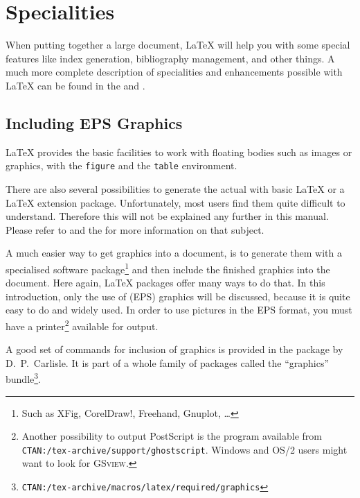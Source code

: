  
\chapter{Specialities}
\begin{intro}
  When putting together a large document, \LaTeX{} will help you
  with some special features like index generation,
  bibliography management, and other things.
  A much more complete description of specialities and
  enhancements possible with \LaTeX{} can be found in the
  {\normalfont\manual{}} and {\normalfont \companion}.
\end{intro}

\section{Including EPS Graphics}
\LaTeX{} provides the basic facilities to work with floating bodies
such as images or graphics, with the \texttt{figure} and the
\texttt{table} environment.

There are also several possibilities to generate the actual
 with basic \LaTeX{} or a \LaTeX{} extension package.
Unfortunately, most users find them quite difficult to understand.
Therefore this will not be explained any further in this manual.
Please refer to \companion{} and the \manual{} for more information on
that subject.

A much easier way to get graphics into a document, is to generate them
with a specialised software package\footnote{Such as XFig, CorelDraw!,
  Freehand, Gnuplot, \ldots} and then include the finished graphics
into the document. Here again, \LaTeX{} packages offer many ways to do
that. In this introduction, only the use of  (EPS) graphics will be discussed, because it is quite
easy to do and widely used.  In order to use pictures in the EPS
format, you must have a  printer\footnote{Another
  possibility to output PostScript is the \textsc{}
  program available from
  \texttt{CTAN:/tex-archive/support/ghostscript}. Windows and OS/2 users might
  want to look for \textsc{GSview}.} available for output.

A good set of commands for inclusion of graphics is provided in the
 package by D.~P.~Carlisle. It is part of a whole family
of packages called the ``graphics''
bundle\footnote{\texttt{CTAN:/tex-archive/macros/latex/required/graphics}}.


